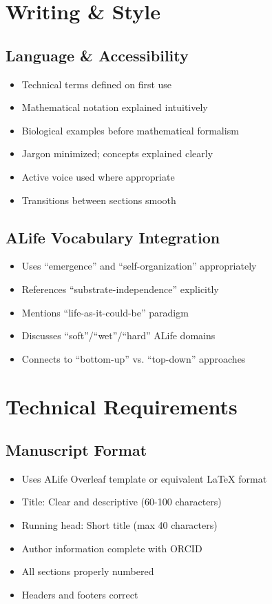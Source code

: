 \documentclass[11pt]{article}
\begin{document}
\section{Writing \& Style}

\subsection{Language \& Accessibility}

\begin{itemize}[label=$\square$]
    \item Technical terms defined on first use
    \item Mathematical notation explained intuitively
    \item Biological examples before mathematical formalism
    \item Jargon minimized; concepts explained clearly
    \item Active voice used where appropriate
    \item Transitions between sections smooth
\end{itemize}

\subsection{ALife Vocabulary Integration}

\begin{itemize}[label=$\square$]
    \item Uses ``emergence'' and ``self-organization'' appropriately
    \item References ``substrate-independence'' explicitly
    \item Mentions ``life-as-it-could-be'' paradigm
    \item Discusses ``soft''/``wet''/``hard'' ALife domains
    \item Connects to ``bottom-up'' vs. ``top-down'' approaches
\end{itemize}

\section{Technical Requirements}

\subsection{Manuscript Format}

\begin{itemize}[label=$\square$]
    \item Uses ALife Overleaf template or equivalent LaTeX format
    \item Title: Clear and descriptive (60-100 characters)
    \item Running head: Short title (max 40 characters)
    \item Author information complete with ORCID
    \item All sections properly numbered
    \item Headers and footers correct
\end{itemize}
\end{document}
